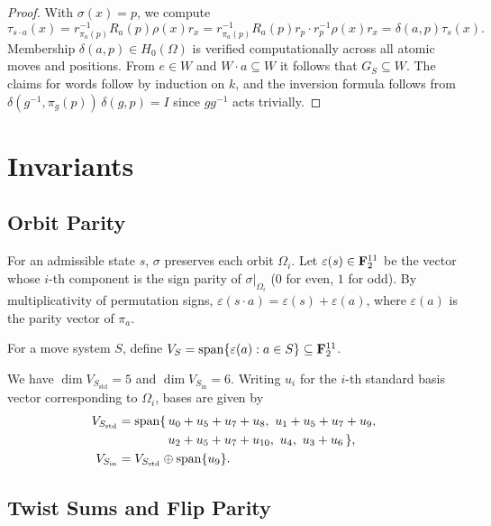 \documentclass[a4paper,11pt]{article}
\begin{document}
\begin{proof}
With $\sigma(x)=p$, we compute
\[
\tau_{s\cdot a}(x)=r_{\pi_a(p)}^{-1}R_a(p)\rho(x)r_x
=r_{\pi_a(p)}^{-1}R_a(p)r_p\cdot r_p^{-1}\rho(x)r_x=\delta(a,p)\tau_s(x).
\]
Membership $\delta(a,p)\in H_0(\Omega)$ is verified computationally across all atomic moves and positions.
From $e\in W$ and $W\cdot a\subseteq W$ it follows that $G_S\subseteq W$.
The claims for words follow by induction on $k$, and the inversion formula follows from $\delta(g^{-1},\pi_g(p))\,\delta(g,p)=I$ since $gg^{-1}$ acts trivially.
\end{proof}

\section{Invariants}\label{sec:invariants}

\subsection{Orbit Parity}

For an admissible state $s$, $\sigma$ preserves each orbit $\Omega_i$.
Let $\varepsilon(s)\in\mathbf{F}_2^{11}$ be the vector whose $i$-th component is the sign parity of $\sigma|_{\Omega_i}$ ($0$ for even, $1$ for odd).
By multiplicativity of permutation signs, $\varepsilon(s\cdot a)=\varepsilon(s)+\varepsilon(a)$, where $\varepsilon(a)$ is the parity vector of $\pi_a$.

\begin{definition}
For a move system $S$, define $V_S=\operatorname{span}\{\varepsilon(a):a\in S\}\subseteq\mathbf{F}_2^{11}$.
\end{definition}

\begin{proposition}[Check C5]\label{prop:parity}
We have $\dim V_{S_{\mathrm{std}}}=5$ and $\dim V_{S_{\mathrm{in}}}=6$.
Writing $u_i$ for the $i$-th standard basis vector corresponding to $\Omega_i$, bases are given by
\begin{align*}
V_{S_{\mathrm{std}}}&=\operatorname{span}\{\,u_0+u_5+u_7+u_8,\ u_1+u_5+u_7+u_9,\\
&\qquad\qquad u_2+u_5+u_7+u_{10},\ u_4,\ u_3+u_6\,\},\\
V_{S_{\mathrm{in}}}&=V_{S_{\mathrm{std}}}\oplus\operatorname{span}\{u_9\}.
\end{align*}
\end{proposition}

\subsection{Twist Sums and Flip Parity}
\end{document}
